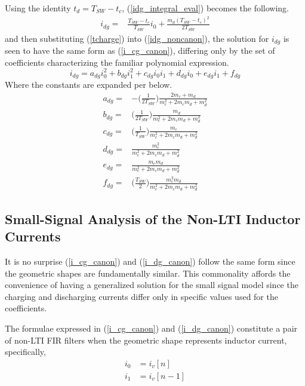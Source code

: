 \documentclass[conference]{IEEEtran}
\begin{document}
Using the identity $t_d = T_{SW} - t_c$, (\ref{idg_integral_eval}) becomes the following.
\begin{align}
i_{dg} = & \frac{ T_{SW} - t_c}{T_{SW}} i_0 + \frac{m_d( T_{SW} - t_c)^2}{2T_{SW}}
\label{idg_noncanon}
\end{align}
and then substituting (\ref{tcharge}) into (\ref{idg_noncanon}), the solution for \(i_{dg}\) is seen to have the same form as (\ref{i_cg_canon}), differing only by the set of coefficients characterizing the familiar polynomial expression.
\begin{equation}
i_{dg} = a_{dg}i_0^2+b_{dg}i_1^2+c_{dg}i_0i_1+d_{dg}i_0+e_{dg}i_1+f_{dg} \label{i_dg_canon}
\end{equation}
Where the constants are expanded per below.
\begin{align*}
a_{dg} = & - \bigg (\frac{1}{2T_{SW}} \bigg)  \frac{2m_c + m_d}{m_c^2+2m_cm_d+m_d^2}  \nonumber\\
b_{dg} = &  \bigg ( \frac{1}{2T_{SW}} \bigg ) \frac{m_d}{m_c^2+2m_cm_d+m_d^2}  \nonumber\\
c_{dg} = & \bigg ( \frac{1}{T_{SW}} \bigg ) \frac{m_c}{m_c^2+2m_cm_d+m_d^2} \nonumber\\
d_{dg} = & \frac{m_c^2}{m_c^2+2m_cm_d+m_d^2}\nonumber\\
e_{dg} = & \frac{m_c m_d}{m_c^2+2m_cm_d+m_d^2}\nonumber\\
f_{dg} = & \bigg ( \frac{T_{SW}}{2} \bigg ) \frac{m_c^2 m_d}{m_c^2+2m_cm_d+m_d^2}
\end{align*}

\subsection{Small-Signal Analysis of the Non-LTI Inductor Currents}
It is no surprise (\ref{i_cg_canon}) and (\ref{i_dg_canon}) follow the same form since the geometric shapes are fundamentally similar. This commonality affords the convenience of having a generalized solution for the small signal model since the charging and discharging currents differ only in specific values used for the coefficients.

The formulae expressed in (\ref{i_cg_canon}) and (\ref{i_dg_canon}) constitute a pair of non-LTI FIR filters when the geometric shape represents inductor current, specifically,
\begin{align}
i_0 &= i_v[n] \nonumber \\
i_1 &= i_v[n-1]
\label{i0i1ivn}
\end{align}
\end{document}
